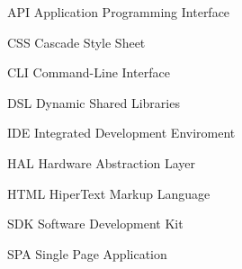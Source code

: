 \begin{siglas}
  
  \item[API] Application Programming Interface
  \item[CSS] Cascade Style Sheet
  \item[CLI] Command-Line Interface
  \item[DSL] Dynamic Shared Libraries
  \item[IDE] Integrated Development Enviroment
  \item[HAL] Hardware Abstraction Layer
  \item[HTML] HiperText Markup Language
  \item[SDK] Software Development Kit
  \item[SPA] Single Page Application
    
\end{siglas}
